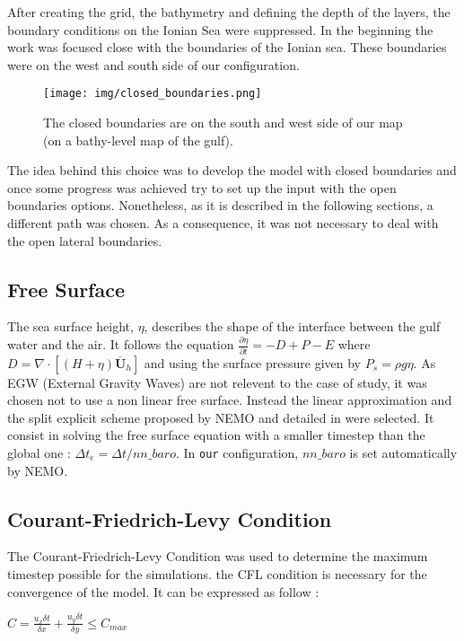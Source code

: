 \documentclass[english]{PFeENSTA}
\begin{document}
{After creating the grid, the bathymetry and defining the depth of the layers, the boundary conditions on the Ionian Sea were suppressed. In the beginning the work was focused close with the boundaries of the Ionian sea. These boundaries were on the west and south side of our configuration. 


\begin{figure}[!h]
\centering
\texttt{[image: img/closed\_boundaries.png]}
\caption{\label{fig:closed_boundaries} The closed boundaries are on the south and west side of our map (on a bathy-level map of the gulf). }
\end{figure}

The idea behind this choice was to develop the model with closed boundaries and once some progress was achieved try to set up the input with the open boundaries options. Nonetheless, as it is described in the following sections, a different path was chosen. As a consequence, it was not necessary to deal with the open lateral boundaries.


\subsection{Free Surface}
The sea surface height, $\eta$, describes the shape of the interface between the gulf water and the air. It follows the equation $\frac{\partial\eta}{\partial t} = - D + P - E$ where $D = \nabla \cdot [(H + \eta) \overline{\textbf{U}}_h]$ and using the surface pressure given by $P_s = \rho g \eta$.
As EGW (External Gravity Waves) are not relevent to the case of study, it was chosen not to use a non linear free surface. Instead the linear approximation and the split explicit scheme proposed by NEMO and detailed in \cite{SHCHEPETKIN2005347} were selected. It consist in solving the free surface equation with a smaller timestep than the global one : $\Delta t_e = \Delta t / nn\_baro$. In \texttt{our} configuration, $nn\_baro$ is set automatically by NEMO.



\subsection{Courant-Friedrich-Levy Condition}

The Courant-Friedrich-Levy Condition was used to determine the maximum timestep possible for the simulations. the CFL condition is necessary for the convergence of the model. It can be expressed as follow :
\begin{center}
$C=\frac{u_x \delta t}{\delta x} + \frac{u_y \delta t}{\delta y} \leq C_{max} $
\end{center}

}
\end{document}
